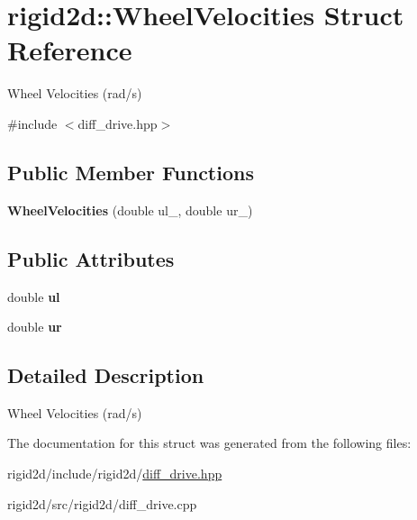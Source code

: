 \hypertarget{structrigid2d_1_1WheelVelocities}{}\section{rigid2d\+:\+:Wheel\+Velocities Struct Reference}
\label{structrigid2d_1_1WheelVelocities}


Wheel Velocities (rad/s)  




{\ttfamily \#include $<$diff\+\_\+drive.\+hpp$>$}

\subsection*{Public Member Functions}
\begin{DoxyCompactItemize}
\item 
\mbox{\label{structrigid2d_1_1WheelVelocities_aad8c1b4f7b1ae11ced0df0e5bab6caee}} 
{\bfseries Wheel\+Velocities} (double ul\+\_\+, double ur\+\_\+)
\end{DoxyCompactItemize}
\subsection*{Public Attributes}
\begin{DoxyCompactItemize}
\item 
\mbox{\label{structrigid2d_1_1WheelVelocities_a7e2524297e82e99d40e575633184d060}} 
double {\bfseries ul}
\item 
\mbox{\label{structrigid2d_1_1WheelVelocities_a647f6d1dd95af0323780c8b7d639ccf3}} 
double {\bfseries ur}
\end{DoxyCompactItemize}


\subsection{Detailed Description}
Wheel Velocities (rad/s) 

The documentation for this struct was generated from the following files\+:\begin{DoxyCompactItemize}
\item 
rigid2d/include/rigid2d/\hyperlink{diff__drive_8hpp}{diff\+\_\+drive.\+hpp}\item 
rigid2d/src/rigid2d/diff\+\_\+drive.\+cpp\end{DoxyCompactItemize}
